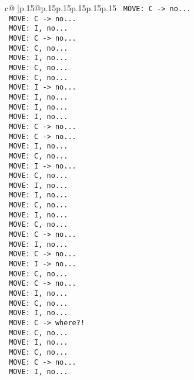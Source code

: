 \documentclass{article}
\begin{document}
{\begin{supertabular}{c@{$\;$}|p{.15\linewidth}@{}p{.15\linewidth}p{.15\linewidth}p{.15\linewidth}p{.15\linewidth}p{.15\linewidth}}
{{{\texttt{ MOVE: C {-}> no...} \\
\texttt{ MOVE: C {-}> no...} \\
\texttt{ MOVE: I, no...} \\
\texttt{ MOVE: C {-}> no...} \\
\texttt{ MOVE: C, no...} \\
\texttt{ MOVE: I, no...} \\
\texttt{ MOVE: C, no...} \\
\texttt{ MOVE: C, no...} \\
\texttt{ MOVE: I {-}> no...} \\
\texttt{ MOVE: I, no...} \\
\texttt{ MOVE: I, no...} \\
\texttt{ MOVE: I, no...} \\
\texttt{ MOVE: C {-}> no...} \\
\texttt{ MOVE: C {-}> no...} \\
\texttt{ MOVE: I, no...} \\
\texttt{ MOVE: C, no...} \\
\texttt{ MOVE: I {-}> no...} \\
\texttt{ MOVE: C, no...} \\
\texttt{ MOVE: I, no...} \\
\texttt{ MOVE: I, no...} \\
\texttt{ MOVE: C, no...} \\
\texttt{ MOVE: I, no...} \\
\texttt{ MOVE: C, no...} \\
\texttt{ MOVE: C {-}> no...} \\
\texttt{ MOVE: I, no...} \\
\texttt{ MOVE: C {-}> no...} \\
\texttt{ MOVE: I {-}> no...} \\
\texttt{ MOVE: C, no...} \\
\texttt{ MOVE: C {-}> no...} \\
\texttt{ MOVE: I, no...} \\
\texttt{ MOVE: C, no...} \\
\texttt{ MOVE: I, no...} \\
\texttt{ MOVE: C {-}> where?!} \\
\texttt{ MOVE: C, no...} \\
\texttt{ MOVE: I, no...} \\
\texttt{ MOVE: C, no...} \\
\texttt{ MOVE: C {-}> no...} \\
\texttt{ MOVE: I, no...} \\
}}}
\end{supertabular}}
\end{document}
